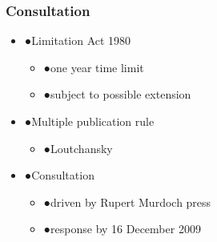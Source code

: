 \documentclass[ignorenonframetext,]{beamer}
\begin{document}
\begin{frame}
\frametitle{Consultation}

\begin{itemize}
\item  {●}Limitation Act 1980

  \begin{itemize}
  \item    {●}one year time limit
  \item    {●}subject to possible extension
  \end{itemize}
\item  {●}Multiple publication rule

  \begin{itemize}
  \item    {●}Loutchansky
  \end{itemize}
\item  {●}Consultation

  \begin{itemize}
  \item    {●}driven by Rupert Murdoch press
  \item    {●}response by 16 December 2009
  \end{itemize}
\end{itemize}

~

\end{frame}
\end{document}
